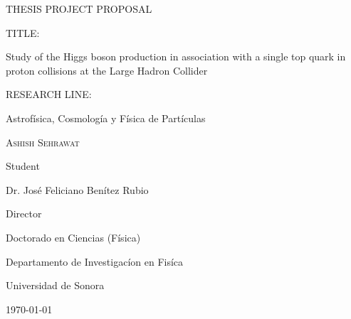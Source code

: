 \documentclass[final,3p]{CSP}
\def\Student{Ashish Sehrawat}
\def\Title{THESIS PROJECT PROPOSAL}
\def\Prog{Doctorado en Ciencias (F\'{i}sica) }
\def\Dept{Departamento de Investigac\'{i}on en Fis\'{i}ca}
\def\Director{Dr. Jos\'{e} Feliciano Ben\'{i}tez Rubio}
\def\ProjectTitle{Study of the Higgs boson production in association with a single top quark in proton collisions at the Large Hadron Collider}
\begin{document}
\begin{titlepage}
  \centering
  \hspace{0pt}
  \vfill
        {\scshape\Large \Title \par}

	\vspace{2cm}
        \begin{adjustwidth}{2cm}{2cm}{
            TITLE:\par
            {\large \ProjectTitle \par}
          }
        \end{adjustwidth}

	\vspace{0.5cm}
        \begin{adjustwidth}{2cm}{2cm}{
            RESEARCH LINE: \par
            Astrof\'{i}sica, Cosmolog\'{i}a y F\'{i}sica de Part\'{i}culas \par}
        \end{adjustwidth}

        
        \vspace{4cm}
        {\underline{\hspace{8cm}}\par}
	{\scshape\large \Student \par}
        {Student\par}

        \vspace{1cm}
        {\underline{\hspace{8cm}}\par}
	{\Director \par}
        {Director\par}

        \vspace{1cm}
        {\Prog \par}
        {\Dept \par}
        {Universidad de Sonora \par}

        \vspace{4cm}
	{\today}

\hspace{0pt}
\vfill

\end{titlepage}


\shipout\null


\newpage
\hspace{0pt}
\vfill
\end{document}
